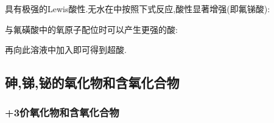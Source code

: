 \documentclass{ctexart}
\begin{document}
具有极强的Lewis酸性.无水在中按照下式反应,酸性显著增强(即氟锑酸):
\begin{center}
\end{center}
与氟磺酸中的氧原子配位时可以产生更强的酸:
\begin{center}
\end{center}
再向此溶液中加入即可得到超酸.
\subsection{砷,锑,铋的氧化物和含氧化合物}
\subsubsection{+3价氧化物和含氧化合物}
\end{document}
